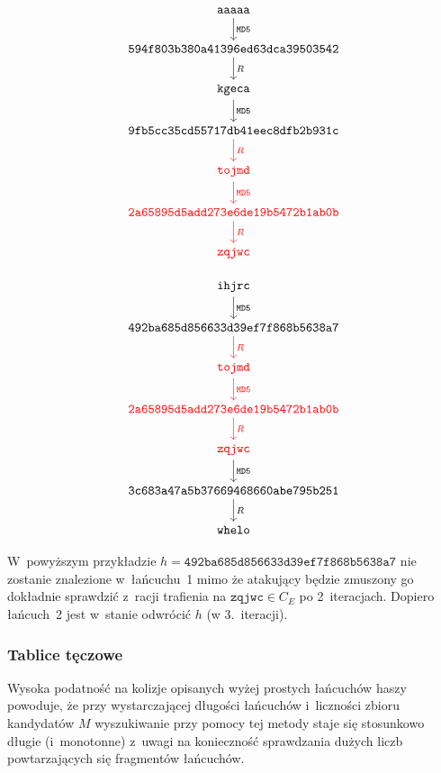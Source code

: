 \begin{multicols}{2}
    \[
    \begin{tikzcd}
        \mathtt{aaaaa} \arrow{d}{\mathtt{MD5}} \\
        \mathtt{594f803b380a41396ed63dca39503542} \arrow{d}{R} \\
        \mathtt{kgeca} \arrow{d}{\mathtt{MD5}} \\
        \mathtt{9fb5cc35cd55717db41eec8dfb2b931c} \arrow[color=red]{d}{R} \\
        \mathtt{\textcolor{red}{tojmd}} \arrow[color=red]{d}{\mathtt{MD5}} \\
        \mathtt{\textcolor{red}{2a65895d5add273e6de19b5472b1ab0b}} \arrow[color=red]{d}{R} \\
        \mathtt{\textcolor{red}{zqjwc}}
    \end{tikzcd}
    \]

\columnbreak

    \[
    \begin{tikzcd}
        \mathtt{ihjrc} \arrow{d}{\mathtt{MD5}} \\
        \mathtt{492ba685d856633d39ef7f868b5638a7} \arrow[color=red]{d}{R} \\
        \mathtt{\textcolor{red}{tojmd}} \arrow[color=red]{d}{\mathtt{MD5}} \\
        \mathtt{\textcolor{red}{2a65895d5add273e6de19b5472b1ab0b}} \arrow[color=red]{d}{R} \\
        \mathtt{\textcolor{red}{zqjwc}} \arrow{d}{\mathtt{MD5}} \\
        \mathtt{3c683a47a5b37669468660abe795b251} \arrow{d}{R} \\
        \mathtt{whelo}
    \end{tikzcd}
    \]
\end{multicols}

W~powyższym przykładzie $h = \mathtt{492ba685d856633d39ef7f868b5638a7}$ nie
zostanie znalezione w~łańcuchu~1 mimo że atakujący będzie zmuszony go dokładnie
sprawdzić z~racji trafienia na $\mathtt{zqjwc} \in C_E$ po 2~iteracjach.
Dopiero łańcuch~2 jest w~stanie odwrócić $h$ (w 3.~iteracji).



\subsubsection{Tablice tęczowe}
Wysoka podatność na kolizje opisanych wyżej prostych łańcuchów haszy
powoduje, że przy wystarczającej długości łańcuchów i~liczności zbioru
kandydatów $M$ wyszukiwanie przy pomocy tej metody staje się stosunkowo
długie (i~monotonne) z~uwagi na konieczność sprawdzania dużych liczb
powtarzających się fragmentów łańcuchów.

